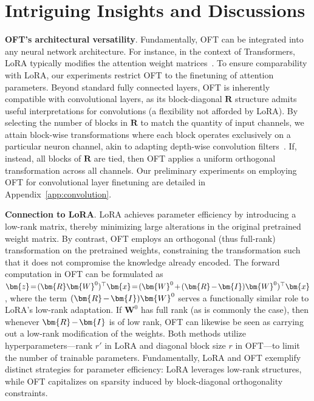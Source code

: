 {\section{Intriguing Insights and Discussions}

\textbf{OFT's architectural versatility}. Fundamentally, OFT can be integrated into any neural network architecture. For instance, in the context of Transformers, LoRA typically modifies the attention weight matrices~\cite{hulora2022}. To ensure comparability with LoRA, our experiments restrict OFT to the finetuning of attention parameters. Beyond standard fully connected layers, OFT is inherently compatible with convolutional layers, as its block-diagonal $\bm{R}$ structure admits useful interpretations for convolutions (a flexibility not afforded by LoRA). By selecting the number of blocks in $\bm{R}$ to match the quantity of input channels, we attain block-wise transformations where each block operates exclusively on a particular neuron channel, akin to adapting depth-wise convolution filters~\cite{chollet2017xception}. If, instead, all blocks of $\bm{R}$ are tied, then OFT applies a uniform orthogonal transformation across all channels. Our preliminary experiments on employing OFT for convolutional layer finetuning are detailed in Appendix~\ref{app:convolution}.

\textbf{Connection to LoRA}. LoRA achieves parameter efficiency by introducing a low-rank matrix, thereby minimizing large alterations in the original pretrained weight matrix. By contrast, OFT employs an orthogonal (thus full-rank) transformation on the pretrained weights, constraining the transformation such that it does not compromise the knowledge already encoded. The forward computation in OFT can be formulated as $\thickmuskip=2mu \medmuskip=2mu \bm{z}=(\bm{R}\bm{W}^0)^\top\bm{x}=(\bm{W}^0+(\bm{R}-\bm{I})\bm{W}^0)^\top\bm{x}$, where the term $\thickmuskip=2mu \medmuskip=2mu (\bm{R}-\bm{I})\bm{W}^0$ serves a functionally similar role to LoRA's low-rank adaptation. If $\bm{W}^0$ has full rank (as is commonly the case), then whenever $\thickmuskip=2mu \medmuskip=2mu \bm{R}-\bm{I}$ is of low rank, OFT can likewise be seen as carrying out a low-rank modification of the weights. Both methods utilize hyperparameters—rank $r'$ in LoRA and diagonal block size $r$ in OFT—to limit the number of trainable parameters. Fundamentally, LoRA and OFT exemplify distinct strategies for parameter efficiency: LoRA leverages low-rank structures, while OFT capitalizes on sparsity induced by block-diagonal orthogonality constraints.

}
